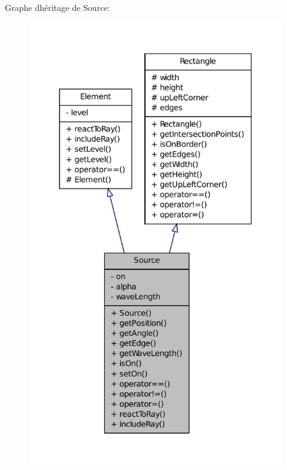 Graphe d\textquotesingle{}héritage de Source\+:\nopagebreak
\begin{figure}[H]
\begin{center}
\leavevmode
\includegraphics[height=550pt]{da/d95/classSource__inherit__graph}
\end{center}
\end{figure}


